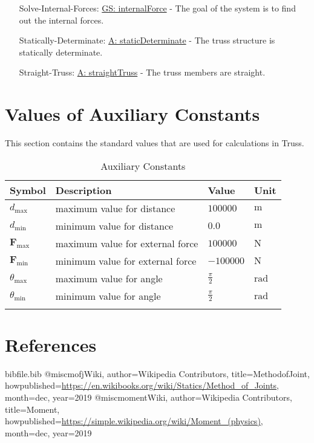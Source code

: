 \documentclass[12pt]{article}
\begin{document}
\begin{itemize}
\item[Solve-Internal-Forces:\phantomsection\label{unlikeChgSIF}]{\hyperref[internalForce]{GS: internalForce} -  The goal of the system is to find out the internal forces.}
\item[Statically-Determinate:\phantomsection\label{unlikeChgStatD}]{\hyperref[staticDeterminate]{A: staticDeterminate} -  The truss structure is statically determinate.}
\item[Straight-Truss:\phantomsection\label{unlikeChgST}]{\hyperref[straightTruss]{A: straightTruss} -  The truss members are straight.}
\end{itemize}
\section{Values of Auxiliary Constants}
\label{Sec:AuxConstants}
This section contains the standard values that are used for calculations in Truss.

\begin{longtable}{l l l l}
\toprule
\textbf{Symbol} & \textbf{Description} & \textbf{Value} & \textbf{Unit}
\\
\midrule
\endhead
${d_{\text{max}}}$ & maximum  value for distance & $100000$ & ${\text{m}}$
\\
${d_{\text{min}}}$ & minimum  value for distance & $0.0$ & ${\text{m}}$
\\
${\mathbf{F}_{\text{max}}}$ & maximum  value for external force & $100000$ & ${\text{N}}$
\\
${\mathbf{F}_{\text{min}}}$ & minimum  value for external force & $-100000$ & ${\text{N}}$
\\
${θ_{\text{max}}}$ & maximum  value for angle & $\frac{π}{2}$ & ${\text{rad}}$
\\
${θ_{\text{min}}}$ & minimum  value for angle & $\frac{π}{2}$ & ${\text{rad}}$
\\
\bottomrule
\caption{Auxiliary Constants}
\label{Table:TAuxConsts}
\end{longtable}
\section{References}
\label{Sec:References}
\begin{filecontents*}{bibfile.bib}
@misc{mofjWiki,
author={Wikipedia Contributors},
title={MethodofJoint},
howpublished={\url{https://en.wikibooks.org/wiki/Statics/Method\_of\_Joints}},
month=dec,
year={2019}}
@misc{momentWiki,
author={Wikipedia Contributors},
title={Moment},
howpublished={\url{https://simple.wikipedia.org/wiki/Moment\_(physics)}},
month=dec,
year={2019}}
\end{filecontents*}
\nocite{*}
\printbibliography[heading=none]
\end{document}
